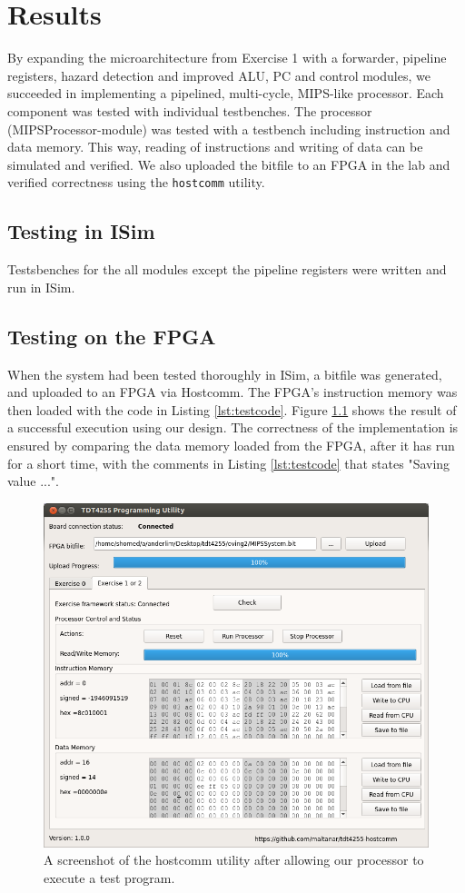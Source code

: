 \chapter{Results}

By expanding the microarchitecture from Exercise 1 \cite{compendium} with a forwarder, pipeline registers, hazard detection and improved ALU, PC and control modules, we succeeded in implementing a pipelined, multi-cycle, MIPS-like processor.
Each component was tested with individual testbenches.
The processor (MIPSProcessor-module) was tested with a testbench including instruction and data memory.
This way, reading of instructions and writing of data can be simulated and verified.
We also uploaded the bitfile to an FPGA in the lab and verified correctness using the \texttt{hostcomm} utility.

\section{Testing in ISim}
Testsbenches for the all modules except the pipeline registers were written and run in ISim. 

\section{Testing on the FPGA}
When the system had been tested thoroughly in ISim, a bitfile was generated, and uploaded to an FPGA via Hostcomm.
The FPGA's instruction memory was then loaded with the code in Listing \ref{lst:testcode}.
Figure \ref{fig:hostcomm} shows the result of a successful execution using our design.
The correctness of the implementation is ensured by comparing the data memory loaded from the FPGA, after it has run for a short time, with the comments in Listing \ref{lst:testcode} that states "Saving value ...".

\begin{figure}[h!]
    \includegraphics[width=\linewidth]{img/hostcomm_result.png}
    \caption{A screenshot of the hostcomm utility after allowing our processor to execute a test program.}
    \label{fig:hostcomm}
\end{figure}

